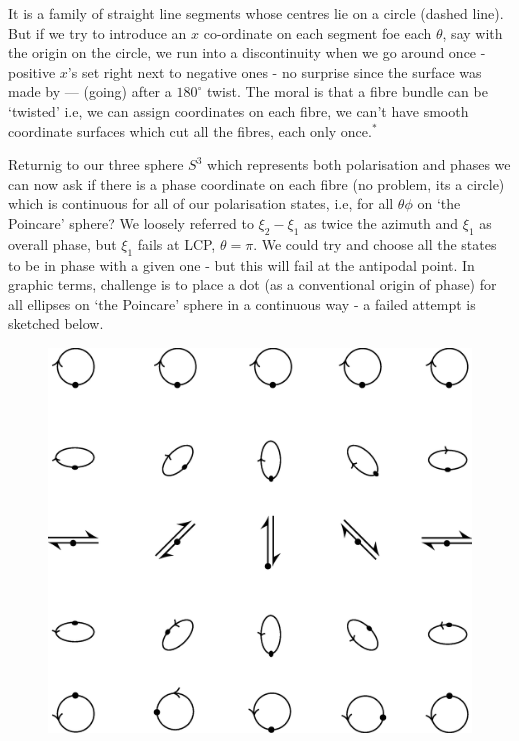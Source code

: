 It is a family of straight line segments whose centres lie on a circle (dashed
line). But if we try to introduce an $x$ co-ordinate on each segment foe each $\theta$,
say with the origin on the circle, we run into a discontinuity when we go around
once - positive $x$'s set right next to negative ones - no surprise since the surface
was made by --- (going) after a $180^{\circ}$ twist. The moral is that a fibre bundle can
be `twisted' i.e, we can assign coordinates on each fibre, we can't have smooth
coordinate surfaces which cut all the fibres, each only once.$^{\ast}$

Returnig to our three sphere $S^3$ which represents both polarisation and
phases we can now ask if there is a phase coordinate on each fibre (no problem,
its a circle) which is continuous for all of our polarisation states, i.e, for all $\theta \phi$
on `the Poincare' sphere? We loosely referred to $\xi_2 - \xi_1$ as twice the azimuth and
$\xi_1$ as overall phase, but $\xi_1$ fails at LCP, $\theta = \pi$. We could try and choose all the
states to be in phase with a given one - but this will fail at the antipodal point.
In graphic terms, challenge is to place a dot (as a conventional origin of phase)
for all ellipses on `the Poincare' sphere in a continuous way - a failed attempt is
sketched below.
\begin{figure}[H]
\centering
\includegraphics[scale=0.2]{src/images/chap26/18.eps}
\end{figure}

